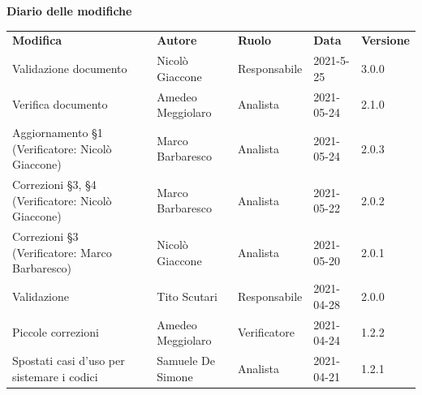 \documentclass[a4paper]{article}
\begin{document}
\begin{center}
    \centering
    \textbf{\Large Diario delle modifiche}\\
    \vspace{10px}
    \renewcommand{\arraystretch}{1.8}
    \label{tab:RequisitiFunzionali}
    \begin{longtable}[!h]{p{160px} p{90px} p{60px} p{60px} p{50px}}
        \rowcolor{logo!70} \textbf{Modifica}                         & \textbf{Autore}                            & \textbf{Ruolo}                 & \textbf{Data} & \textbf{Versione} \\
        Validazione documento                                        & Nicolò Giaccone                            & Responsabile                   & 2021-5-25     & 3.0.0             \\
        Verifica documento                                           & Amedeo Meggiolaro                          & Analista                       & 2021-05-24    & 2.1.0             \\
        Aggiornamento \S1 \newline (Verificatore: Nicolò Giaccone)   & Marco Barbaresco                           & Analista                       & 2021-05-24    & 2.0.3             \\
        Correzioni \S3, \S4 \newline (Verificatore: Nicolò Giaccone) & Marco Barbaresco                           & Analista                       & 2021-05-22    & 2.0.2             \\
        Correzioni \S3 \newline (Verificatore: Marco Barbaresco)     & Nicolò Giaccone                            & Analista                       & 2021-05-20    & 2.0.1             \\
        Validazione                                                  & Tito Scutari                               & Responsabile                   & 2021-04-28    & 2.0.0             \\
        Piccole correzioni                                           & Amedeo Meggiolaro                          & Verificatore                   & 2021-04-24    & 1.2.2             \\
        Spostati casi d'uso per sistemare i codici                   & Samuele De Simone                          & Analista                       & 2021-04-21    & 1.2.1             \\

\end{longtable}
\end{center}
\end{document}

